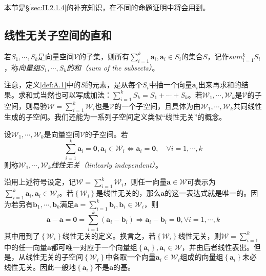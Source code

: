 \documentclass[main.tex]{subfiles}
\begin{document}
本节是\S\ref{sec:II.2.1.4}的补充知识，在不同的命题证明中将会用到。
\subsection{线性无关子空间的直和}
\begin{definition}[向量组的和]\label{def:A.1}
    若$S_1,\cdots,S_k$是向量空间$\mathcal{V}$的子集，则所有$\sum_{i=1}^k\mathbf{a}_i,\mathbf{a}_i\in S_i$的集合$S$，记作$sum_{i=1}^k S_i$，称\emph{向量组$S_1,\cdots,S_k$的和（sum of the subsects）}。
\end{definition}

注意，定义\ref{def:A.1}中的$S$的元素，是从每个$S_i$中抽一个向量$\mathbf{a}_i$出来再求和的结果。求和式当然也可以写成加法：$\sum_{i=1}^k S_k=S_1+\cdots+S_k$。若$\mathcal{W}_1,\cdots,\mathcal{W}_k$是$\mathcal{V}$的子空间，则易验$\mathcal{W}=\sum_{i=1}^k\mathcal{W}_i$也是$\mathcal{V}$的一个子空间，且具体为由$\mathcal{W}_1,\cdots,\mathcal{W}_k$共同线性生成的子空间。我们还能为一系列子空间定义类似“线性无关”的概念。

\begin{definition}[线性无关子空间]\label{def:A.2}
    设$\mathcal{W}_1,\cdots,\mathcal{W}_k$是向量空间$\mathcal{V}$的子空间。若
    \[\sum_{i=1}^k\mathbf{a}_i=\mathbf{0},\mathbf{a}_i\in\mathcal{W}_i\Leftrightarrow \mathbf{a}_i=\mathbf{0},\quad\forall i=1,\cdots,k\]
    则称$\mathcal{W}_1,\cdots,\mathcal{W}_k$\emph{线性无关（linlearly independent）}。
\end{definition}

沿用上述符号设定，记$\mathcal{W}=\sum_{i=1}^k\mathcal{W}_i$，则任一向量$\mathbf{a}\in\mathcal{W}$可表示为$\sum_{i=1}^k\mathbf{a}_i,\mathbf{a}_i\in\mathcal{W}_i$。若$\left\{\mathcal{W}_i\right\}$是线性无关的，那么$\mathbf{a}$的这一表达式就是唯一的。因为若另有$\mathbf{b}_1,\cdots,\mathbf{b}_k$满足$\mathbf{a}=\sum_{i=1}^k\mathbf{b}_i,\mathbf{b}_i\in\mathcal{W}_i$，则
\[\mathbf{a}-\mathbf{a}=\mathbf{0}=\sum_{i=1}^k\left(\mathbf{a}_i-\mathbf{b}_i\right)\Rightarrow\mathbf{a}_i-\mathbf{b}_i=\mathbf{0},\forall i=1,\cdots,k\]
其中用到了$\left\{\mathcal{W}_i\right\}$线性无关的定义。换言之，若$\left\{\mathcal{W}_i\right\}$线性无关，则$\mathcal{W}=\sum_{i=1}^k$中的任一向量$\mathbf{a}$都可唯一对应于一个向量组$\left\{\mathbf{a}_i\right\},\mathbf{a}_i\in\mathcal{W}$，并由后者线性表出。但是，从线性无关的子空间$\left\{\mathcal{W}_i\right\}$中各取一个向量$\mathbf{a}_i\in\mathcal{W}_i$组成的向量组$\left\{\mathbf{a}_i\right\}$未必线性无关。因此一般地$\left\{\mathbf{a}_i\right\}$不是$\mathbf{a}$的基。
\end{document}
